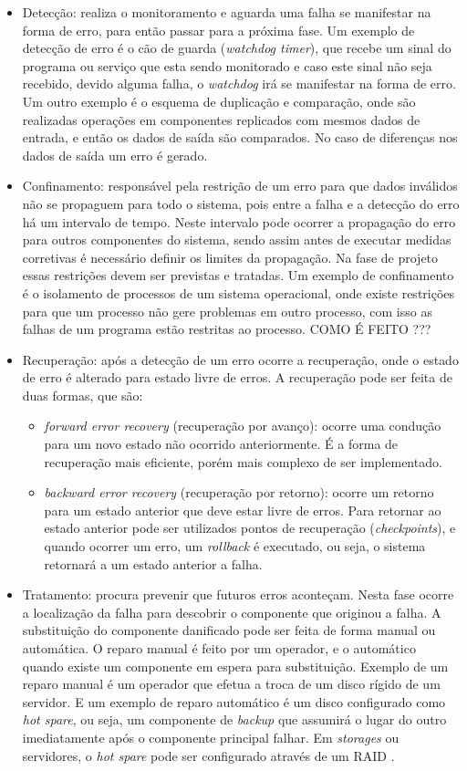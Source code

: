 \begin{itemize}
 \item Detecção: realiza o monitoramento e aguarda uma falha se manifestar na forma de erro, para então passar para a próxima fase. 
 Um exemplo de detecção de erro é o cão de guarda (\textit{watchdog timer}), que recebe um sinal do programa ou serviço que esta sendo 
 monitorado e caso este sinal não seja recebido, devido alguma falha, o \textit{watchdog} irá se manifestar na forma de erro. 
 Um outro exemplo é o esquema de duplicação e comparação, onde são realizadas operações em componentes replicados com mesmos dados de 
 entrada, e então os dados de saída são comparados. No caso de diferenças nos dados de saída um erro é gerado.
 \item Confinamento: responsável pela restrição de um erro para que dados inválidos não se propaguem para todo o sistema, pois entre a falha e a
 detecção do erro há um intervalo de tempo. Neste intervalo pode ocorrer a propagação do erro para outros componentes do sistema, sendo assim 
 antes de executar medidas corretivas é necessário definir os limites da propagação. Na fase de projeto essas restrições devem ser previstas
 e tratadas. Um exemplo de confinamento é o isolamento de processos de um sistema operacional, onde existe restrições para que um processo
 não gere problemas em outro processo, com isso as falhas de um programa estão restritas ao processo. COMO É FEITO ???
 \item Recuperação: após a detecção de um erro ocorre a recuperação, onde o estado de erro é alterado para estado livre de erros. A recuperação
 pode ser feita de duas formas, que são:
 \begin{itemize}
  \item \textit{forward error recovery} (recuperação por avanço): ocorre uma condução para um novo estado não ocorrido anteriormente. É a forma
  de recuperação mais eficiente, porém mais complexo de ser implementado.
  \item \textit{backward error recovery} (recuperação por retorno): ocorre um retorno para um estado anterior que deve estar livre de erros.
  Para retornar ao estado anterior pode ser utilizados pontos de recuperação (\textit{checkpoints}), e quando ocorrer um erro, um 
  \textit{rollback} é executado, ou seja, o sistema retornará a um estado anterior a falha.
 \end{itemize}
 \item Tratamento: procura prevenir que futuros erros aconteçam. Nesta fase ocorre a localização da falha para descobrir o 
 componente que originou a falha. A substituição do componente danificado pode ser feita de forma manual ou automática. 
 O reparo manual é feito por um operador, e o automático quando existe um componente em espera para substituição. Exemplo de um reparo 
 manual é um operador que efetua a troca de um disco rígido de um servidor. E um exemplo de reparo automático é um disco configurado como 
 \textit{hot spare}, ou seja, um componente de \textit{backup} que assumirá o lugar do outro imediatamente após o componente principal 
 falhar. Em \textit{storages} ou servidores, o \textit{hot spare} pode ser configurado através de um \ac{RAID} \cite{rouse2013}.
\end{itemize}

